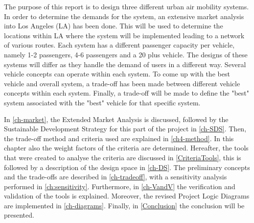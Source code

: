 The purpose of this report is to design three different urban air mobility systems. In order to determine the demands for the system, an extensive market analysis into Los Angeles (LA) has been done. This will be used to determine the locations within LA where the system will be implemented leading to a network of various routes. Each system has a different passenger capacity per vehicle, namely 1-2 passengers, 4-6 passengers and a 20 plus vehicle. The designs of these systems will differ as they handle the demand of users in a different way. Several vehicle concepts can operate within each system. To come up with the best vehicle and overall system, a trade-off has been made between different vehicle concepts within each system. Finally, a trade-off will be made to define the "best" system associated with the "best" vehicle for that specific system. 

In \autoref{ch-market}, the Extended Market Analysis is discussed, followed by the Sustainable Development Strategy for this part of the project in \autoref{ch-SDS}. Then, the trade-off method and criteria used are explained in \autoref{ch4-method}. In this chapter also the weight factors of the criteria are determined. Hereafter, the tools that were created to analyse the criteria are discussed in \autoref{CriteriaTools}, this is followed by a description of the design space in \autoref{ch-DS}. The preliminary concepts and the trade-offs are described in \autoref{ch-tradeoff}, with a sensitivity analysis performed in \autoref{ch:sensitivity}. Furthermore, in \autoref{ch-VandV} the verification and validation of the tools is explained. Moreover, the revised Project Logic Diagrams are implemented in \autoref{ch-diagrams}. Finally, in \autoref{Conclusion} the conclusion will be presented.
